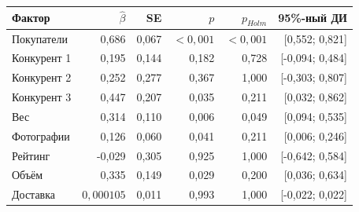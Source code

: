 \begin{tabular}{lrrrrr}
\toprule
Фактор & $\widehat\beta$ & SE & $p$ & $p_{Holm}$ & 95\%-ный ДИ \\
\midrule
Покупатели & 0,686 & 0,067 & $<0{,}001$ & $<0{,}001$ & [0,552; 0,821] \\
Конкурент 1 & 0,195 & 0,144 & 0,182 & 0,728 & [-0,094; 0,484] \\
Конкурент 2 & 0,252 & 0,277 & 0,367 & 1,000 & [-0,303; 0,807] \\
Конкурент 3 & 0,447 & 0,207 & 0,035 & 0,211 & [0,032; 0,862] \\
Вес & 0,314 & 0,110 & 0,006 & 0,049 & [0,094; 0,535] \\
Фотографии & 0,126 & 0,060 & 0,041 & 0,211 & [0,006; 0,246] \\
Рейтинг & -0,029 & 0,305 & 0,925 & 1,000 & [-0,642; 0,584] \\
Объём & 0,335 & 0,149 & 0,029 & 0,200 & [0,036; 0,634] \\
Доставка & $0{,}000105$ & 0,011 & 0,993 & 1,000 & [-0,022; 0,022] \\
\bottomrule
\end{tabular}
